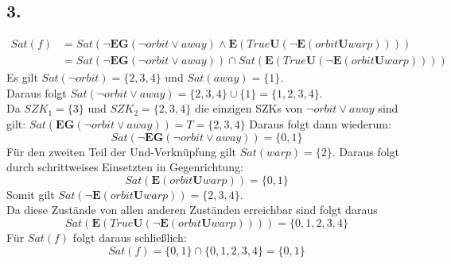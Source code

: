\documentclass[12pt, paper=a4]{article}
\begin{document}
\subsection*{3.}
\begin{align*}
Sat(f) &= Sat(\neg \mathbf{EG}(\neg orbit\lor away)\land \mathbf{E}(True\mathbf{U}(\neg \mathbf{E}(orbit\mathbf{U}warp)))) \\ &= Sat(\neg \mathbf{EG}(\neg orbit\lor away)) \cap Sat(\mathbf{E}(True\mathbf{U}(\neg \mathbf{E}(orbit\mathbf{U}warp))))
\end{align*}
Es gilt $Sat(\neg orbit)=\{2,3,4\}$ und $Sat(away)=\{1\}$.\\
Daraus folgt $Sat(\neg orbit \lor away)=\{2,3,4\} \cup \{1\} = \{1,2,3,4\}$.\\
Da $SZK_{1}=\{3\}$ und $SZK_{2}= \{2,3,4\}$ die einzigen SZKs von $\neg orbit \lor away$ sind gilt: $Sat( \mathbf{EG}(\neg orbit\lor away))=T=\{2,3,4\}$
Daraus folgt dann wiederum: \[Sat(\neg \mathbf{EG}(\neg orbit\lor away))=\{0,1\}  \]
Für den zweiten Teil der Und-Verknüpfung gilt $Sat(warp)=\{2\}$. Daraus folgt durch schrittweises Einsetzten in Gegenrichtung:\[ Sat(\mathbf{E}(orbit\mathbf{U}warp))=\{0,1\} \]
Somit gilt $Sat(\neg \mathbf{E}(orbit\mathbf{U}warp))=\{2,3,4\}$. \\
Da diese Zustände von allen anderen Zuständen erreichbar sind folgt daraus \[Sat(\mathbf{E}(True\mathbf{U}(\neg \mathbf{E}(orbit\mathbf{U}warp))))=\{0,1,2,3,4\}  \]
Für $Sat(f)$ folgt daraus schließlich:\[ Sat(f)= \{0,1\} \cap \{0,1,2,3,4\} = \{0,1\} \]
\\
\end{document}
